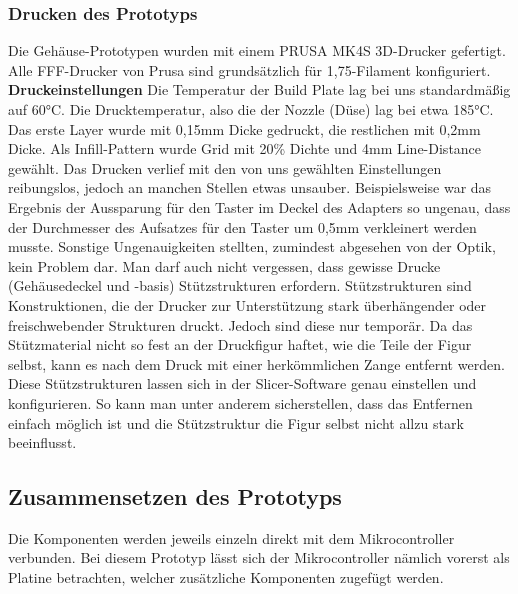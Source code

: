 \documentclass[11pt, twoside]{article}
\begin{document}
\subsubsection{Drucken des Prototyps}
Die Gehäuse-Prototypen wurden mit einem \glqq PRUSA MK4S\grqq{} 3D-Drucker gefertigt. Alle FFF-Drucker von Prusa sind grundsätzlich für 1,75-Filament konfiguriert.
\vspace{4mm}\newline
\textbf{Druckeinstellungen} \newline
Die Temperatur der Build Plate lag bei uns standardmäßig auf 60°C. Die Drucktemperatur, also die der Nozzle (Düse) lag bei etwa 185°C. \newline
Das erste Layer wurde mit 0,15mm Dicke gedruckt, die restlichen mit 0,2mm Dicke. \newline
Als Infill-Pattern wurde \glqq Grid\grqq{} mit 20\% Dichte und 4mm Line-Distance gewählt. \newline
Das Drucken verlief mit den von uns gewählten Einstellungen reibungslos, jedoch an manchen Stellen etwas unsauber. Beispielsweise war das Ergebnis der Aussparung für den Taster im Deckel des Adapters so ungenau, dass der Durchmesser des Aufsatzes für den Taster um 0,5mm verkleinert werden musste. Sonstige Ungenauigkeiten stellten, zumindest abgesehen von der Optik, kein Problem dar. \newline
Man darf auch nicht vergessen, dass gewisse Drucke (Gehäusedeckel und -basis) Stützstrukturen erfordern. Stützstrukturen sind Konstruktionen, die der Drucker zur Unterstützung stark überhängender oder freischwebender Strukturen druckt. Jedoch sind diese nur temporär. Da das Stützmaterial nicht so fest an der Druckfigur haftet, wie die Teile der Figur selbst, kann es nach dem Druck mit einer herkömmlichen Zange entfernt werden. Diese Stützstrukturen lassen sich in der Slicer-Software genau einstellen und konfigurieren. So kann man unter anderem sicherstellen, dass das Entfernen einfach möglich ist und die Stützstruktur die Figur selbst nicht allzu stark beeinflusst. \parencite[vgl.][]{noauthor_urlnl16_nodate}
\subsection{Zusammensetzen des Prototyps}
Die Komponenten werden jeweils einzeln direkt mit dem Mikrocontroller verbunden. Bei diesem Prototyp lässt sich der Mikrocontroller nämlich vorerst als Platine betrachten, welcher zusätzliche Komponenten zugefügt werden.
\end{document}
